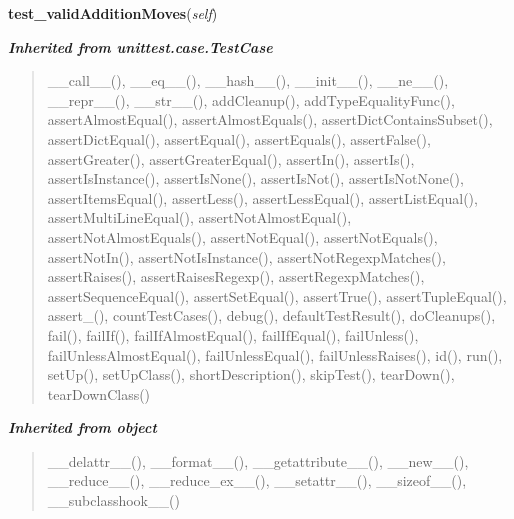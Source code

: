     \label{UnBlockMe:test:MapTests:mapTests:TestMap:test_validAdditionMoves}

    \vspace{0.5ex}

\hspace{.8\funcindent}\begin{boxedminipage}{\funcwidth}

    \raggedright \textbf{test\_validAdditionMoves}(\textit{self})

\setlength{\parskip}{2ex}
\setlength{\parskip}{1ex}
    \end{boxedminipage}


\large{\textbf{\textit{Inherited from unittest.case.TestCase}}}

\begin{quote}
\_\_call\_\_(), \_\_eq\_\_(), \_\_hash\_\_(), \_\_init\_\_(), \_\_ne\_\_(), \_\_repr\_\_(), \_\_str\_\_(), addCleanup(), addTypeEqualityFunc(), assertAlmostEqual(), assertAlmostEquals(), assertDictContainsSubset(), assertDictEqual(), assertEqual(), assertEquals(), assertFalse(), assertGreater(), assertGreaterEqual(), assertIn(), assertIs(), assertIsInstance(), assertIsNone(), assertIsNot(), assertIsNotNone(), assertItemsEqual(), assertLess(), assertLessEqual(), assertListEqual(), assertMultiLineEqual(), assertNotAlmostEqual(), assertNotAlmostEquals(), assertNotEqual(), assertNotEquals(), assertNotIn(), assertNotIsInstance(), assertNotRegexpMatches(), assertRaises(), assertRaisesRegexp(), assertRegexpMatches(), assertSequenceEqual(), assertSetEqual(), assertTrue(), assertTupleEqual(), assert\_(), countTestCases(), debug(), defaultTestResult(), doCleanups(), fail(), failIf(), failIfAlmostEqual(), failIfEqual(), failUnless(), failUnlessAlmostEqual(), failUnlessEqual(), failUnlessRaises(), id(), run(), setUp(), setUpClass(), shortDescription(), skipTest(), tearDown(), tearDownClass()
\end{quote}

\large{\textbf{\textit{Inherited from object}}}

\begin{quote}
\_\_delattr\_\_(), \_\_format\_\_(), \_\_getattribute\_\_(), \_\_new\_\_(), \_\_reduce\_\_(), \_\_reduce\_ex\_\_(), \_\_setattr\_\_(), \_\_sizeof\_\_(), \_\_subclasshook\_\_()
\end{quote}

